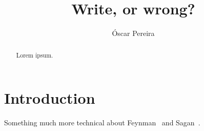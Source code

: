 \documentclass[a4paper,12pt,dvipsnames*]{article}
\title{
Write, or wrong?
}
\author{
  Óscar Pereira
}
\date{\vspace{-4em}}
\begin{document}
\maketitle
{}

\begin{abstract}
  Lorem ipsum.
\end{abstract}

\section{Introduction}
  \label{sec:intro}
  Something much more technical about Feynman~\cite{Feynman74} and Sagan~\cite{Sagan}.

{}


\end{document}
